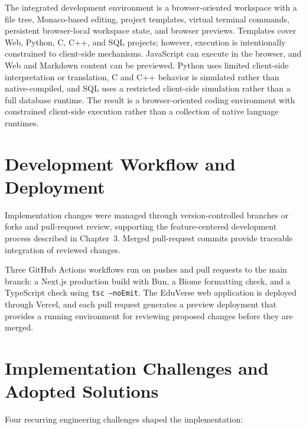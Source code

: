 The integrated development environment is a browser-oriented workspace with a
file tree, Monaco-based editing, project templates, virtual terminal commands,
persistent browser-local workspace state, and browser previews. Templates cover
Web, Python, C, C++, and SQL projects; however, execution is intentionally
constrained to client-side mechanisms. JavaScript can execute in the browser,
and Web and Markdown content can be previewed. Python uses limited client-side
interpretation or translation, C and C++ behavior is simulated rather than
native-compiled, and SQL uses a restricted client-side simulation rather than a
full database runtime. The result is a browser-oriented coding environment with
constrained client-side execution rather than a collection of native language
runtimes.

\section{Development Workflow and Deployment}
\label{sec:development_workflow_deployment}

Implementation changes were managed through version-controlled branches or
forks and pull-request review, supporting the feature-centered development
process described in Chapter~3. Merged pull-request commits provide traceable
integration of reviewed changes.

Three GitHub Actions workflows run on pushes and pull requests to the main
branch: a Next.js production build with Bun, a Biome formatting check, and a
TypeScript check using \texttt{tsc --noEmit}. The EduVerse web application is
deployed through Vercel, and each pull request generates a preview deployment
that provides a running environment for reviewing proposed changes before they
are merged.

\section{Implementation Challenges and Adopted Solutions}
\label{sec:implementation_challenges_adopted_solutions}

Four recurring engineering challenges shaped the implementation:

